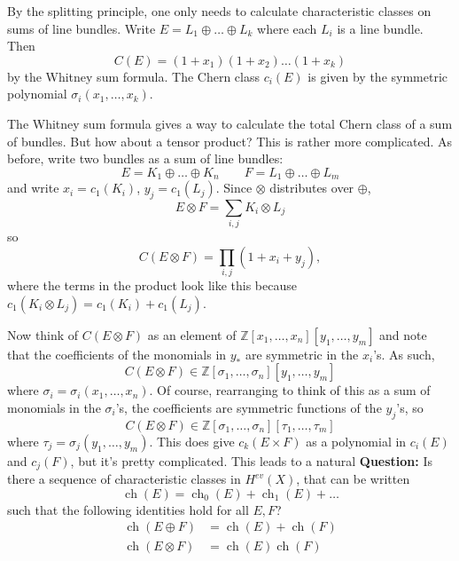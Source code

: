 \documentclass[a4paper,10pt]{article}
\theoremstyle{plain}%
\theoremstyle{definition}
\theoremstyle{remark}
\newcommand{\ZZ}{\mathbb{Z}}
\DeclareMathOperator{\ch}{ch}
\begin{document}
By the splitting principle, one only needs to calculate characteristic
classes on sums of line bundles. Write $E = L_1\oplus \dots \oplus
L_k$ where each $L_i$ is a line bundle. Then
\begin{equation*}
  C(E) = (1+x_1)(1+x_2)\dots (1+x_k)
\end{equation*}
by the Whitney sum formula. The Chern class $c_i(E)$ is given by the
symmetric polynomial $\sigma_i(x_1,\dots ,x_k)$.

The Whitney sum formula gives a way to calculate the total Chern class
of a sum of bundles. But how about a tensor product? This is rather
more complicated. As before, write two bundles as a sum of line
bundles:
\begin{equation*}
  E = K_1 \oplus \dots \oplus K_n \qquad
  F = L_1 \oplus \dots \oplus L_m
\end{equation*}
and write $x_i = c_1(K_i)$, $y_j = c_1(L_j)$. Since $\otimes$
distributes over $\oplus$,
\begin{equation*}
  E \otimes F = \sum_{i,j} K_i \otimes L_j
\end{equation*}
so
\begin{equation*}
  C(E\otimes F) = \prod_{i,j}(1+x_i+y_j),
\end{equation*}
where the terms in the product look like this because $c_1(K_i\otimes
L_j) = c_1(K_i)+c_1(L_j)$.

Now think of $C(E\otimes F)$ as an element of
$\ZZ[x_1,\dots,x_n][y_1,\dots,y_m]$ and note that the coefficients
of the monomials in $y_*$ are symmetric in the $x_i$'s. As such,
\begin{equation*}
  C(E\otimes F) \in \ZZ[\sigma_1,\dots,\sigma_n][y_1,\dots,y_m]
\end{equation*}
where $\sigma_i = \sigma_i(x_1,\dots,x_n)$. Of course, rearranging to
think of this as a sum of monomials in the $\sigma_i$'s, the
coefficients are symmetric functions of the $y_j$'s, so
\begin{equation*}
  C(E\otimes F) \in \ZZ[\sigma_1,\dots,\sigma_n][\tau_1,\dots,\tau_m]
\end{equation*}
where $\tau_j = \sigma_j(y_1,\dots,y_m)$. This does give $c_k(E\times
F)$ as a polynomial in $c_i(E)$ and $c_j(F)$, but it's pretty
complicated. This leads to a natural \textbf{Question:} Is there a
sequence of characteristic classes in $H^{ev}(X)$, that can be written
\begin{equation*}
  \ch(E) = \ch_0(E) + \ch_1(E) + \dots
\end{equation*}
such that the following identities hold for all $E, F$?
\begin{align*}
  \ch(E\oplus F) &= \ch(E) + \ch(F)\\
  \ch(E\otimes F) &= \ch(E)\ch(F)
\end{align*}
\end{document}
